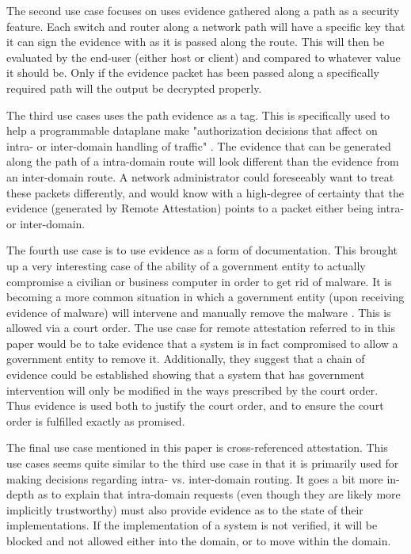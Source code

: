 \documentclass[12pt]{article}
\begin{document}
    The second use case focuses on uses evidence gathered along a path as a security feature. Each switch and router along a network path will have a specific key that it can sign the evidence with as it is passed along the route. This will then be evaluated by the end-user (either host or client) and compared to whatever value it should be. Only if the evidence packet has been passed along a specifically required path will the output be decrypted properly.
    
    The third use cases uses the path evidence as a tag. This is specifically used to help a programmable dataplane make "authorization decisions that affect on intra- or inter-domain handling of traffic" \cite{prog_data}. The evidence that can be generated along the path of a intra-domain route will look different than the evidence from an inter-domain route. A network administrator could foreseeably want to treat these packets differently, and would know with a high-degree of certainty that the evidence (generated by Remote Attestation) points to a packet either being intra- or inter-domain.
    
    The fourth use case is to use evidence as a form of documentation. This brought up a very interesting case of the ability of a government entity to actually compromise a civilian or business computer in order to get rid of malware. It is becoming a more common situation in which a government entity (upon receiving evidence of malware) will intervene and manually remove the malware \cite{doj_hack}. This is allowed via a court order. The use case for remote attestation referred to in this paper would be to take evidence that a system is in fact compromised to allow a government entity to remove it. Additionally, they suggest that a chain of evidence could be established showing that a system that has government intervention will only be modified in the ways prescribed by the court order. Thus evidence is used both to justify the court order, and to ensure the court order is fulfilled exactly as promised.
    
    The final use case mentioned in this paper is cross-referenced attestation. This use cases seems quite similar to the third use case in that it is primarily used for making decisions regarding intra- vs. inter-domain routing. It goes a bit more in-depth as to explain that intra-domain requests (even though they are likely more implicitly trustworthy) must also provide evidence as to the state of their implementations. If the implementation of a system is not verified, it will be blocked and not allowed either into the domain, or to move within the domain. 
\end{document}
